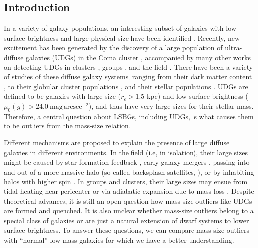 \documentclass[twocolumn,astrosymb,twocolappendix]{aastex631}
\newcommand{\sbunit}{\mathrm{mag\ arcsec}^{-2}}
\newcommand{\sbcen}{\mu_{0}(g)}
\begin{document}
\begin{CJK*}{UTF8}{gbsn}


\section{Introduction} \label{sec:intro}
In a variety of galaxy populations, an interesting subset of galaxies with low surface brightness and large physical size have been identified \citep[dubbed low surface brightness galaxies or LSBGs, e.g.,][]{Sandage1984,Caldwell1987,Impey1988,McGaugh1995,Dalcanton1997a}. Recently, new excitement has been generated by the discovery of a large population of ultra-diffuse galaxies (UDGs) in the Coma cluster \citep{vanDokkum2015}, accompanied by many other works on detecting UDGs in clusters \citep[e.g.,][]{Koda2015,Mihos2015,Yagi2016,vdBurg2016,vdBurg2017,Lee2017,ManceraPina2018,Zaritsky2019}, groups \citep[e.g.,][]{Roman2017b,Greco2018,SAGA-II,CarlstenELVES2022}, and the field \citep[e.g.,][]{Leisman2017,Roman2019,Prole2019,Tanoglidis2021,Kadowaki2021}. There have been a variety of studies of these diffuse galaxy systems, ranging from their dark matter content \citep[e.g.,][]{Mowla2017,vanDokkum2018,vanDokkum2019,Wasserman2019,Keim2022}, to their globular cluster populations \citep[e.g.,][]{vanDokkum2017,Somalwar2020,Forbes2020,Danieli2022,Gannon2022}, and their stellar populations \citep[e.g.,][]{Gu2018,Ferre-Mateu2018,Villaume2022}. UDGs are defined to be galaxies with large size ($r_e > 1.5$ kpc) and low surface brightness ($\sbcen > 24.0\ \sbunit$), and thus have very large sizes for their stellar mass. Therefore, a central question about LSBGs, including UDGs, is what causes them to be outliers from the mass-size relation.  

Different mechanisms are proposed to explain the presence of large diffuse galaxies in different environments. In the field (i.e, in isolation), their large sizes might be caused by star-formation feedback \citep{DiCintio2017,Chan2018}, early galaxy mergers \citep{Wright2021}, passing into and out of a more massive halo (so-called backsplash satellites, \citealt{Benavides2021}), or by inhabiting halos with higher spin \citep{Dalcanton1997,Amorisco2016,Liao2019,Benavides2022}. In groups and clusters, their large sizes may ensue from tidal heating near pericenter \citep{Jiang2019} or via adiabatic expansion due to mass loss \citep{Tremmel2020}. Despite theoretical advances, it is still an open question how mass-size outliers like UDGs are formed and quenched. It is also unclear whether mass-size outliers belong to a special class of galaxies or are just a natural extension of dwarf systems to lower surface brightness. To answer these questions, we can compare mass-size outliers with ``normal'' low mass galaxies for which we have a better understanding. 


\end{CJK*}
\end{document}
